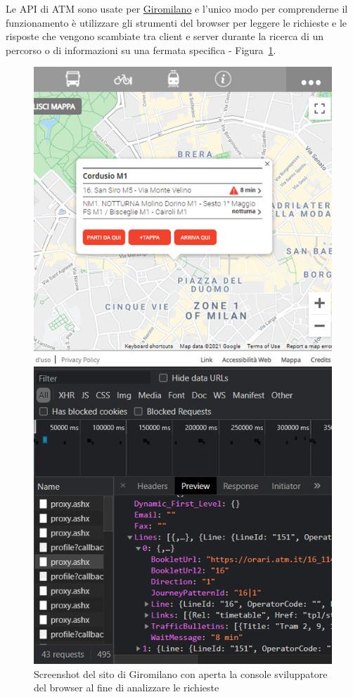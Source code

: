 \documentclass[12pt,a4paper]{report}
\begin{document}
Le API di ATM sono usate per \href{https://giromilano.atm.it}{Giromilano} e l'unico modo per comprenderne il funzionamento è utilizzare
gli strumenti del browser per leggere le richieste e le risposte che vengono scambiate tra client e server durante la ricerca di un
percorso o di informazioni su una fermata specifica - Figura~\ref{fig:giromilanoconsolel}.

\begin{figure}[h]
  \centering
  \includegraphics[width=\textwidth]{giromilanoconsole}
  \caption{Screenshot del sito di Giromilano con aperta la console sviluppatore del browser al fine di analizzare le richieste}
  \label{fig:giromilanoconsolel}
\end{figure}
\end{document}
